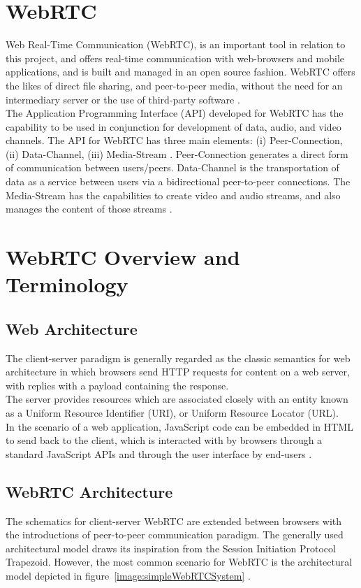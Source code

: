 \section{WebRTC}
Web Real-Time Communication (WebRTC), is an important tool in relation to this project, and offers real-time communication with web-browsers and mobile applications, and is built and managed in an open source fashion. WebRTC offers the likes of direct file sharing, and peer-to-peer media, without the need for an intermediary server or the use of third-party software \cite{johnston2012webrtc}. 
\\The Application Programming Interface (API) developed for WebRTC has the capability to be used in conjunction for development of data, audio, and video channels. The API for WebRTC has three main elements: (i) Peer-Connection, (ii) Data-Channel, (iii) Media-Stream \cite{jesup2015webrtc}. Peer-Connection generates a direct form of communication between users/peers. Data-Channel is the transportation of data as a service between users via a bidirectional peer-to-peer connections. The Media-Stream has the capabilities  to create video and audio streams, and also manages the content of those streams \cite{14003034520191201}.

\section{WebRTC Overview and Terminology}
\subsection{Web Architecture}
The client-server paradigm is generally regarded as the classic semantics for web architecture in which browsers send HTTP requests for content on a web server, with replies with a payload containing the response.
\\The server provides resources which are associated closely with an entity known as a Uniform Resource Identifier (URI), or Uniform Resource Locator (URL).
\\ In the scenario of a web application, JavaScript code can be embedded in HTML to send back to the client, which is interacted with by browsers through a standard JavaScript APIs and through the user interface by end-users \cite{loreto2014real}.

\subsection{WebRTC Architecture}
The schematics for client-server WebRTC are extended between browsers with the introductions of peer-to-peer communication paradigm. The generally used architectural model draws its inspiration from the Session Initiation Protocol Trapezoid. However, the most common scenario for WebRTC is the architectural model depicted in figure~\ref{image:simpleWebRTCSystem} \cite{loreto2014real}.

